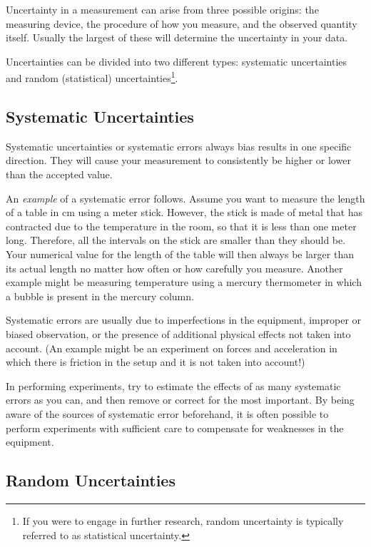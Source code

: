 \documentclass[letterpaper, 12pt]{book}
\newcommand{\myskip}{\vspace{0.5\baselineskip}}
\begin{document}
Uncertainty in a measurement can arise from three possible origins: the measuring device, the procedure of how you measure, and the observed quantity itself. Usually the largest of these will determine the uncertainty in your data. \myskip

Uncertainties can be divided into two different types: systematic uncertainties and random (statistical) uncertainties\footnote{If you were to engage in further research, random uncertainty is typically referred to as statistical uncertainty.}.

\subsection{Systematic Uncertainties}


Systematic uncertainties or systematic errors always bias results in one specific direction. They will cause your measurement to consistently be higher or lower than the accepted value. \myskip

An \emph{example} of a systematic error follows. Assume you want to measure the length of a table in cm using a meter stick. However, the stick is made of metal that has contracted due to the temperature in the room, so that it is less than one meter long. Therefore, all the intervals on the stick are smaller than they should be. Your numerical value for the length of the table will then always be larger than its actual length no matter how often or how carefully you measure. Another example might be measuring temperature using a mercury thermometer in which a bubble is present in the mercury column. \myskip

Systematic errors are usually due to imperfections in the equipment, improper or biased observation, or the presence of additional physical effects not taken into account. (An example might be an experiment on forces and acceleration in which there is friction in the setup and it is not taken into account!) \myskip

In performing experiments, try to estimate the effects of as many systematic errors as you can, and then remove or correct for the most important. By being aware of the sources of systematic error beforehand, it is often possible to perform experiments with sufficient care to compensate for weaknesses in the equipment.

\subsection{Random Uncertainties}
\end{document}
